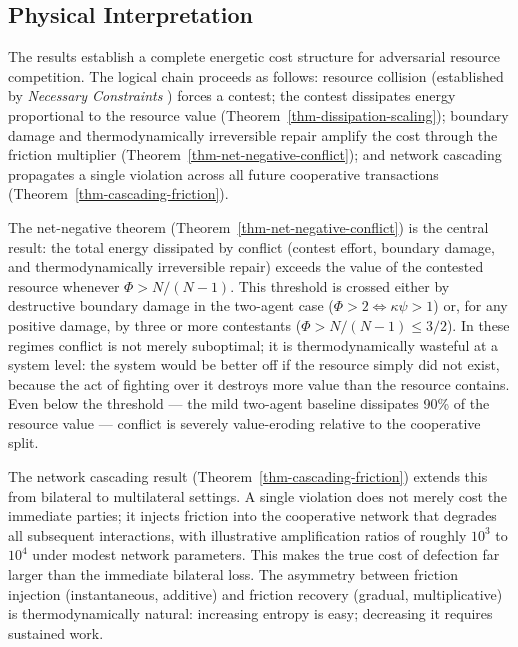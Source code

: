 \documentclass[11pt]{article}
\theoremstyle{plain}
\theoremstyle{definition}
\theoremstyle{remark}
\let\origsubsection\subsection
\renewcommand{\subsection}{\needspace{7\baselineskip}\origsubsection}
\begin{document}
\subsection{Physical Interpretation}\label{physical-interpretation}

The results establish a complete energetic cost structure for
adversarial resource competition. The logical chain proceeds as follows:
resource collision (established by \emph{Necessary Constraints}
\citep{TC-I}) forces a contest; the contest dissipates energy
proportional to the resource value
(Theorem~\ref{thm-dissipation-scaling}); boundary damage and
thermodynamically irreversible repair amplify the cost through the
friction multiplier (Theorem~\ref{thm-net-negative-conflict}); and
network cascading propagates a single violation across all future
cooperative transactions (Theorem~\ref{thm-cascading-friction}).

The net-negative theorem (Theorem~\ref{thm-net-negative-conflict}) is
the central result: the total energy dissipated by conflict (contest
effort, boundary damage, and thermodynamically irreversible repair)
exceeds the value of the contested resource whenever \(\Phi > N/(N-1)\).
This threshold is crossed either by destructive boundary damage in the
two-agent case (\(\Phi > 2 \Leftrightarrow \kappa\psi > 1\)) or, for any
positive damage, by three or more contestants
(\(\Phi > N/(N-1) \leq 3/2\)). In these regimes conflict is not merely
suboptimal; it is thermodynamically wasteful at a system level: the
system would be better off if the resource simply did not exist, because
the act of fighting over it destroys more value than the resource
contains. Even below the threshold --- the mild two-agent baseline
dissipates 90\% of the resource value --- conflict is severely
value-eroding relative to the cooperative split.

The network cascading result (Theorem~\ref{thm-cascading-friction})
extends this from bilateral to multilateral settings. A single violation
does not merely cost the immediate parties; it injects friction into the
cooperative network that degrades all subsequent interactions, with
illustrative amplification ratios of roughly \(10^3\) to \(10^4\) under
modest network parameters. This makes the true cost of defection far
larger than the immediate bilateral loss. The asymmetry between friction
injection (instantaneous, additive) and friction recovery (gradual,
multiplicative) is thermodynamically natural: increasing entropy is
easy; decreasing it requires sustained work.
\end{document}
